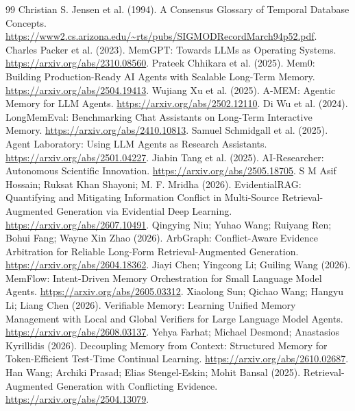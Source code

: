 \documentclass{article}
\begin{document}
\begin{thebibliography}{99}
 Christian S. Jensen et al. (1994). A Consensus Glossary of Temporal Database Concepts. \url{https://www2.cs.arizona.edu/~rts/pubs/SIGMODRecordMarch94p52.pdf}.
 Charles Packer et al. (2023). MemGPT: Towards LLMs as Operating Systems. \url{https://arxiv.org/abs/2310.08560}.
 Prateek Chhikara et al. (2025). Mem0: Building Production-Ready AI Agents with Scalable Long-Term Memory. \url{https://arxiv.org/abs/2504.19413}.
 Wujiang Xu et al. (2025). A-MEM: Agentic Memory for LLM Agents. \url{https://arxiv.org/abs/2502.12110}.
 Di Wu et al. (2024). LongMemEval: Benchmarking Chat Assistants on Long-Term Interactive Memory. \url{https://arxiv.org/abs/2410.10813}.
 Samuel Schmidgall et al. (2025). Agent Laboratory: Using LLM Agents as Research Assistants. \url{https://arxiv.org/abs/2501.04227}.
 Jiabin Tang et al. (2025). AI-Researcher: Autonomous Scientific Innovation. \url{https://arxiv.org/abs/2505.18705}.
 S M Asif Hossain; Ruksat Khan Shayoni; M. F. Mridha (2026). EvidentialRAG: Quantifying and Mitigating Information Conflict in Multi-Source Retrieval-Augmented Generation via Evidential Deep Learning. \url{https://arxiv.org/abs/2607.10491}.
 Qingying Niu; Yuhao Wang; Ruiyang Ren; Bohui Fang; Wayne Xin Zhao (2026). ArbGraph: Conflict-Aware Evidence Arbitration for Reliable Long-Form Retrieval-Augmented Generation. \url{https://arxiv.org/abs/2604.18362}.
 Jiayi Chen; Yingcong Li; Guiling Wang (2026). MemFlow: Intent-Driven Memory Orchestration for Small Language Model Agents. \url{https://arxiv.org/abs/2605.03312}.
 Xiaolong Sun; Qichao Wang; Hangyu Li; Liang Chen (2026). Verifiable Memory: Learning Unified Memory Management with Local and Global Verifiers for Large Language Model Agents. \url{https://arxiv.org/abs/2608.03137}.
 Yehya Farhat; Michael Desmond; Anastasios Kyrillidis (2026). Decoupling Memory from Context: Structured Memory for Token-Efficient Test-Time Continual Learning. \url{https://arxiv.org/abs/2610.02687}.
 Han Wang; Archiki Prasad; Elias Stengel-Eskin; Mohit Bansal (2025). Retrieval-Augmented Generation with Conflicting Evidence. \url{https://arxiv.org/abs/2504.13079}.

\end{thebibliography}
\end{document}
